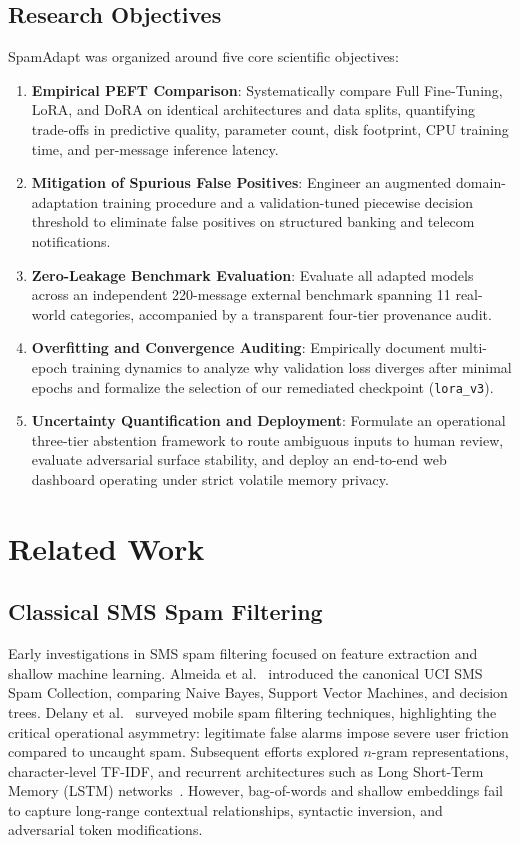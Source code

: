 \documentclass[conference]{IEEEtran}
\begin{document}
\subsection{Research Objectives}
SpamAdapt was organized around five core scientific objectives:
\begin{enumerate}
    \item \textbf{Empirical PEFT Comparison}: Systematically compare Full Fine-Tuning, LoRA, and DoRA on identical architectures and data splits, quantifying trade-offs in predictive quality, parameter count, disk footprint, CPU training time, and per-message inference latency.
    \item \textbf{Mitigation of Spurious False Positives}: Engineer an augmented domain-adaptation training procedure and a validation-tuned piecewise decision threshold to eliminate false positives on structured banking and telecom notifications.
    \item \textbf{Zero-Leakage Benchmark Evaluation}: Evaluate all adapted models across an independent 220-message external benchmark spanning 11 real-world categories, accompanied by a transparent four-tier provenance audit.
    \item \textbf{Overfitting and Convergence Auditing}: Empirically document multi-epoch training dynamics to analyze why validation loss diverges after minimal epochs and formalize the selection of our remediated checkpoint (\texttt{lora\_v3}).
    \item \textbf{Uncertainty Quantification and Deployment}: Formulate an operational three-tier abstention framework to route ambiguous inputs to human review, evaluate adversarial surface stability, and deploy an end-to-end web dashboard operating under strict volatile memory privacy.
\end{enumerate}

\section{Related Work}
\label{sec:related_work}

\subsection{Classical SMS Spam Filtering}
Early investigations in SMS spam filtering focused on feature extraction and shallow machine learning. Almeida et al.~\cite{almeida2011sms} introduced the canonical UCI SMS Spam Collection, comparing Naive Bayes, Support Vector Machines, and decision trees. Delany et al.~\cite{delany2012sms} surveyed mobile spam filtering techniques, highlighting the critical operational asymmetry: legitimate false alarms impose severe user friction compared to uncaught spam. Subsequent efforts explored $n$-gram representations, character-level TF-IDF, and recurrent architectures such as Long Short-Term Memory (LSTM) networks~\cite{hochreiter1997lstm}. However, bag-of-words and shallow embeddings fail to capture long-range contextual relationships, syntactic inversion, and adversarial token modifications.
\end{document}
